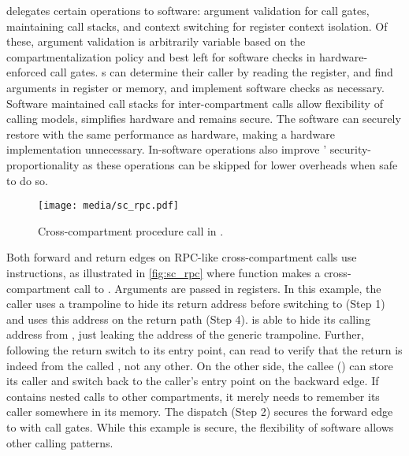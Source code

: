 \seccells delegates certain operations to software: 
argument validation for call gates, 
maintaining call stacks, and context switching for register context isolation.
Of these, argument validation is arbitrarily variable based on the
compartmentalization policy and best left for software checks in 
hardware-enforced call gates.
\secdiv{}s can determine their caller by reading the \rid 
register, and find arguments in register or memory, and implement
software checks as necessary.
Software maintained call stacks for inter-compartment calls 
allow flexibility of calling models,
simplifies hardware and remains secure.
The software can securely restore with the same performance as hardware,
making a hardware implementation unnecessary.
In-software operations also improve \seccells' security-proportionality
as these operations can be skipped for lower overheads when safe to do so.

\begin{figure}
  \centering
  \texttt{[image: media/sc\_rpc.pdf]}
  \caption{Cross-compartment procedure call in \seccells.}
  \label{fig:sc_rpc}
\end{figure}

Both forward and return edges on RPC-like cross-compartment 
calls use \sdswitch instructions, as illustrated in \autoref{fig:sc_rpc} 
where function  makes a cross-compartment call to .
Arguments are passed in registers.
In this example, the caller uses a trampoline to hide its return address
before switching to  (Step 1) and uses this address on the 
return path (Step 4).
 is able to hide its calling address from , just
leaking the address of the generic trampoline.
Further, following the return switch to its entry point, 
can read \rid to verify that the return is indeed from the called 
\secdiv, not any other.
On the other side, the callee () can store its caller and
switch back to the caller's entry point on the backward edge.
If  contains nested calls to other compartments, it
merely needs to remember its caller somewhere in its memory.
The dispatch (Step 2) secures the forward edge to  with call
gates.
While this example is secure, the flexibility of software allows other
calling patterns.

